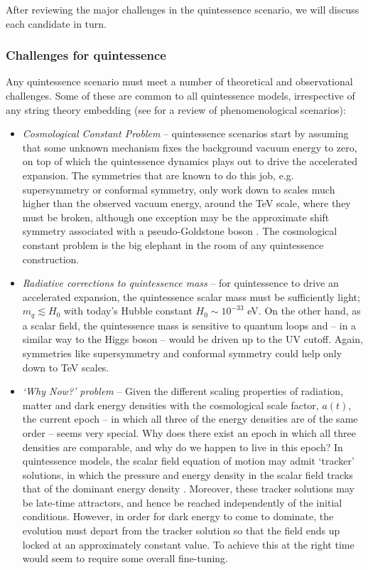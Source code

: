 After reviewing the major challenges in the quintessence scenario, we will discuss each candidate in turn. 


\subsubsection{Challenges for quintessence}
\label{sec:ChallengesQ}

Any quintessence scenario must meet a number of theoretical and observational challenges. Some of these are common to all quintessence models, irrespective of any string theory embedding (see \cite{Kolda:1998wq} for a review of phenomenological scenarios):
\begin{itemize}
\item \emph{Cosmological Constant Problem} -- quintessence scenarios start by assuming that some unknown mechanism fixes the background vacuum energy to zero, on top of which the quintessence dynamics plays out to drive the accelerated expansion. The symmetries that are known to do this job, e.g. supersymmetry or conformal symmetry, only work down to scales much higher than the observed vacuum energy, around the TeV scale, where they must be broken, although one exception may be the approximate shift symmetry associated with a pseudo-Goldstone boson \cite{Weinberg:1972fn}. The cosmological constant problem is the big elephant in the room of any quintessence construction. 

\item \emph{Radiative corrections to quintessence mass} -- for quintessence to drive an accelerated expansion, the quintessence scalar mass must be sufficiently light; $m_q \lesssim H_0$ with today's Hubble constant $H_0 \sim 10^{-33}$ eV.  On the other hand, as a scalar field, the quintessence mass is sensitive to quantum loops and -- in a similar way to the Higgs boson -- would be driven up to the UV cutoff. Again, symmetries like supersymmetry and conformal symmetry could help only down to TeV scales.  

\item \emph{`Why Now?' problem} -- Given the different scaling properties of radiation, matter and dark energy densities with the cosmological scale factor, $a(t)$, the current epoch -- in which all three of the energy densities are of the same order -- seems very special. Why does there exist an epoch in which all three densities are comparable, and why do we happen to live in this epoch? In quintessence models, the scalar field equation of motion may admit `tracker' solutions, in which the pressure and energy density in the scalar field tracks that of the dominant energy density \cite{Zlatev:1998tr, Steinhardt:1999nw}. Moreover, these tracker solutions may be late-time attractors, and hence be reached independently of the initial conditions.  However, in order for dark energy to come to dominate, the evolution must depart from the tracker solution so that the field ends up locked at an approximately constant value. To achieve this at the right time would seem to require some overall fine-tuning.


\end{itemize}
